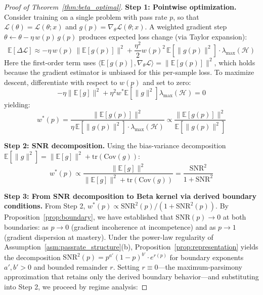 \documentclass{article}
\begin{document}
\begin{proof}[Proof of Theorem~\ref{thm:beta_optimal}]
\textbf{Step 1: Pointwise optimization.}
Consider training on a single problem with pass rate $p$, so that $\mathcal{L}(\theta) = \mathcal{L}(\theta; x)$ and $g(p) = \nabla_\theta \mathcal{L}(\theta; x)$. A weighted gradient step $\theta \leftarrow \theta - \eta \, w(p) \, g(p)$ produces expected loss change (via Taylor expansion):
\begin{equation}
  \mathbb{E}[\Delta \mathcal{L}] \approx -\eta \, w(p) \, \|\mathbb{E}[g(p)]\|^2 + \frac{\eta^2}{2} w(p)^2 \, \mathbb{E}[\|g(p)\|^2] \cdot \lambda_{\max}(\mathcal{H})
\end{equation}
Here the first-order term uses $\langle \mathbb{E}[g(p)], \nabla_\theta \mathcal{L}\rangle = \|\mathbb{E}[g(p)]\|^2$, which holds because the gradient estimator is unbiased for this per-sample loss. To maximize descent, differentiate with respect to $w(p)$ and set to zero:
\begin{equation}
  -\eta \|\mathbb{E}[g]\|^2 + \eta^2 w^* \mathbb{E}[\|g\|^2] \lambda_{\max}(\mathcal{H}) = 0
\end{equation}
yielding:
\begin{equation}
  w^*(p) = \frac{\|\mathbb{E}[g(p)]\|^2}{\eta \, \mathbb{E}[\|g(p)\|^2] \cdot \lambda_{\max}(\mathcal{H})} \propto \frac{\|\mathbb{E}[g(p)]\|^2}{\mathbb{E}[\|g(p)\|^2]}
\end{equation}

\textbf{Step 2: SNR decomposition.}
Using the bias-variance decomposition $\mathbb{E}[\|g\|^2] = \|\mathbb{E}[g]\|^2 + \text{tr}(\text{Cov}(g))$:
\begin{equation}
  w^*(p) \propto \frac{\|\mathbb{E}[g]\|^2}{\|\mathbb{E}[g]\|^2 + \text{tr}(\text{Cov}(g))} = \frac{\text{SNR}^2}{1 + \text{SNR}^2}
\end{equation}

\textbf{Step 3: From SNR decomposition to Beta kernel via derived boundary conditions.}
From Step 2, $w^*(p) \propto \text{SNR}^2(p)/(1+\text{SNR}^2(p))$. By Proposition~\ref{prop:boundary}, we have established that $\text{SNR}(p) \to 0$ at both boundaries: as $p \to 0$ (gradient incoherence at incompetence) and as $p \to 1$ (gradient dispersion at mastery). Under the power-law regularity of Assumption~\ref{asm:passrate_structure}(b), Proposition~\ref{prop:representation} yields the decomposition $\text{SNR}^2(p) = p^{a'}(1-p)^{b'} \cdot e^{r(p)}$ for boundary exponents $a', b' > 0$ and bounded remainder $r$. Setting $r \equiv 0$---the maximum-parsimony approximation that retains only the derived boundary behavior---and substituting into Step 2, we proceed by regime analysis:


\end{proof}
\end{document}
